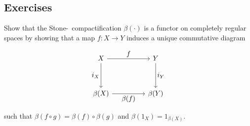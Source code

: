 \documentclass[letterpaper, 11pt, oneside]{book}
\begin{document}
\subsection*{Exercises}

\begin{exercise}
  Show that the Stone-\Cech\ compactification $\beta(\cdot)$ is a functor on completely regular spaces by showing that a map $f\colon X \to Y$ induces a unique commutative diagram
  \begin{figure}[h]
    \centering
    \[
      \begin{tikzcd}[every label/.append style={font=\normalsize}]
        X && Y \\
        \\
        {\beta(X)} && {\beta(Y)}
        \arrow["f", from=1-1, to=1-3]
        \arrow["{i_Y}", from=1-3, to=3-3]
        \arrow["{\beta(f)}"', from=3-1, to=3-3]
        \arrow["{i_X}"', from=1-1, to=3-1]
      \end{tikzcd}
    \]
    \addtocounter{figure}{1}
  \end{figure}
  such that $\beta(f \circ g) = \beta(f) \circ \beta(g)$ and $\beta(1_{X}) = 1_{\beta(X)}$.
\end{exercise}
\end{document}
